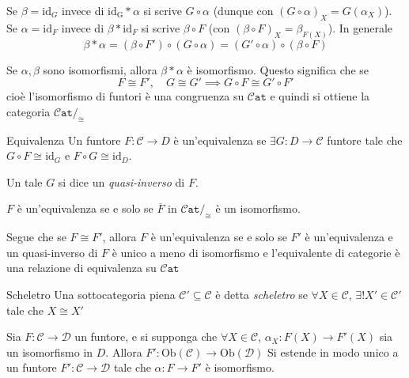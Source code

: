 \begin{note}[zione]
    Se \(\beta = \mathrm{id}_G \) invece di \(\mathrm{id_G} * \alpha\) si scrive
    \(G \circ \alpha\) (dunque con \({(G \circ \alpha)}_X = G{(\alpha_X)}\)). Se
    \(\alpha = \mathrm{id}_F\) invece di \(\beta * \mathrm{id}_F\) si scrive \(\beta \circ F\) (con \({(\beta \circ F)}_X = \beta_{F{(X)}} \)). In generale 
    \[
      \beta * \alpha = {(\beta \circ F')} \circ {(G \circ \alpha)} = {(G' \circ
      \alpha)} \circ {(\beta \circ F)}
    \]
\end{note}
\begin{remark}{}
    Se \(\alpha, \beta\) sono isomorfismi, allora \(\beta * \alpha\) è
    isomorfismo. Questo significa che se 
    \[
      F \cong F', \quad G \cong G' \implies G \circ F \cong G' \circ F'
    \]
    cioè l'isomorfismo di funtori è una congruenza su \(
    \mathtt{\mathcal{C}at}\) e quindi si ottiene la categoria \(\mathtt{\mathcal{C}at} /_{\cong}\)
\end{remark}
\begin{definition}{Equivalenza}
    Un funtore \(F: \mathcal{C} \to D\) è un'equivalenza se \(\exists G : D \to \mathcal{C}\)
    funtore tale che \(G \circ F \cong \mathrm{id}_G\) e \(F \circ G \cong \mathrm{id}_D\).

    Un tale \(G\) si dice un \emph{quasi-inverso} di \(F\).
\end{definition}
\begin{remark}{}
    \(F\) è un'equivalenza se e solo se \(\overline{F} \text{ in } \mathtt{\mathcal{C}at}/_{\cong} \) è un isomorfismo.
\end{remark}

Segue che se \(F \cong F'\), allora \(F\) è un'equivalenza se e solo se \(F'\) è
un'equivalenza e un quasi-inverso di \(F\) è unico a meno di isomorfismo e
l'equivalente di categorie è una relazione di equivalenza su \(\mathtt{\mathcal{C}at}\) 

\begin{definition}{Scheletro}
    Una sottocategoria piena \(\mathcal{C}' \subseteq \mathcal{C} \) è detta \emph{scheletro} se \(\forall X \in \mathcal{C}\), \(\exists ! X' \in \mathcal{C}'\) tale che \(X \cong X'\) 
\end{definition}

\begin{lemma}{}\label{lem:ext-scheletro}
    Sia \(F: \mathcal{C}\to \mathcal{D}\) un funtore, e si supponga che
    \(\forall X \in \mathcal{C}\), \(\alpha_X : F{(X)} \to F'{(X)}\) sia un
    isomorfismo in \(D\). Allora \(F' : \mathrm{Ob}{(\mathcal{C})} \to
    \mathrm{Ob}{(\mathcal{D})}\) Si estende in modo unico a un funtore \(F' :
    \mathcal{C} \to \mathcal{D}\) tale che \(\alpha : F \to F'\) è isomorfismo.
\end{lemma}

